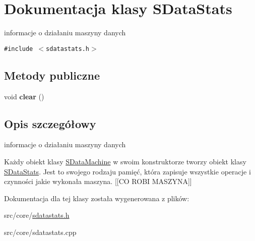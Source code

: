 \hypertarget{classSDataStats}{
\section{Dokumentacja klasy SDataStats}
\label{classSDataStats}
}
informacje o działaniu maszyny danych  


{\tt \#include $<$sdatastats.h$>$}

\subsection*{Metody publiczne}
\begin{CompactItemize}
\item 
\hypertarget{classSDataStats_d160ed884fc050114b9bac8551cc50f9}{
void \textbf{clear} ()}
\label{classSDataStats_d160ed884fc050114b9bac8551cc50f9}

\end{CompactItemize}


\subsection{Opis szczegółowy}
informacje o działaniu maszyny danych 

Każdy obiekt klasy \hyperlink{classSDataMachine}{SDataMachine} w swoim konstruktorze tworzy obiekt klasy \hyperlink{classSDataStats}{SDataStats}. Jest to swojego rodzaju pamięć, która zapisuje wszystkie operacje i czynności jakie wykonała maszyna. \mbox{[}\mbox{[}CO ROBI MASZYNA\mbox{]}\mbox{]} 

Dokumentacja dla tej klasy została wygenerowana z plików:\begin{CompactItemize}
\item 
src/core/\hyperlink{sdatastats_8h}{sdatastats.h}\item 
src/core/sdatastats.cpp\end{CompactItemize}
